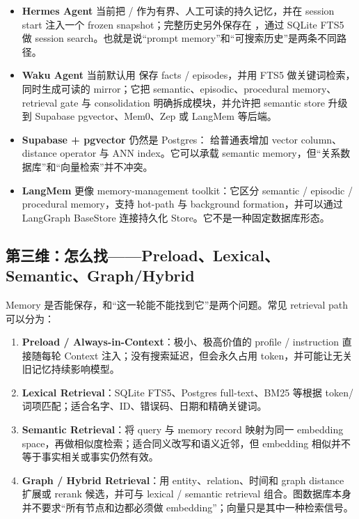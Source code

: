 \documentclass[profile=standard,twoside=false]{ipara-handbook}
\begin{document}
\begin{itemize}
  \item \textbf{Hermes Agent} 当前把  /  作为有界、人工可读的持久记忆，并在 session start 注入一个 frozen snapshot；完整历史另外保存在 ，通过 SQLite FTS5 做 session search。也就是说“prompt memory”和“可搜索历史”是两条不同路径。
  \item \textbf{Waku Agent} 当前默认用  保存 facts / episodes，并用 FTS5 做关键词检索，同时生成可读的  mirror；它把 semantic、episodic、procedural memory、retrieval gate 与 consolidation 明确拆成模块，并允许把 semantic store 升级到 Supabase pgvector、Mem0、Zep 或 LangMem 等后端。
  \item \textbf{Supabase + pgvector} 仍然是 Postgres： 给普通表增加 vector column、distance operator 与 ANN index。它可以承载 semantic memory，但“关系数据库”和“向量检索”并不冲突。
  \item \textbf{LangMem} 更像 memory-management toolkit：它区分 semantic / episodic / procedural memory，支持 hot-path 与 background formation，并可以通过 LangGraph BaseStore 连接持久化 Store。它不是一种固定数据库形态。
\end{itemize}

\subsection{第三维：怎么找——Preload、Lexical、Semantic、Graph/Hybrid}

Memory 是否能保存，和“这一轮能不能找到它”是两个问题。常见 retrieval path 可以分为：

\begin{enumerate}
  \item \textbf{Preload / Always-in-Context}：极小、极高价值的 profile / instruction 直接随每轮 Context 注入；没有搜索延迟，但会永久占用 token，并可能让无关旧记忆持续影响模型。
  \item \textbf{Lexical Retrieval}：SQLite FTS5、Postgres full-text、BM25 等根据 token/词项匹配；适合名字、ID、错误码、日期和精确关键词。
  \item \textbf{Semantic Retrieval}：将 query 与 memory record 映射为同一 embedding space，再做相似度检索；适合同义改写和语义近邻，但 embedding 相似并不等于事实相关或事实仍然有效。
  \item \textbf{Graph / Hybrid Retrieval}：用 entity、relation、时间和 graph distance 扩展或 rerank 候选，并可与 lexical / semantic retrieval 组合。图数据库本身并不要求“所有节点和边都必须做 embedding”；向量只是其中一种检索信号。
\end{enumerate}
\end{document}
